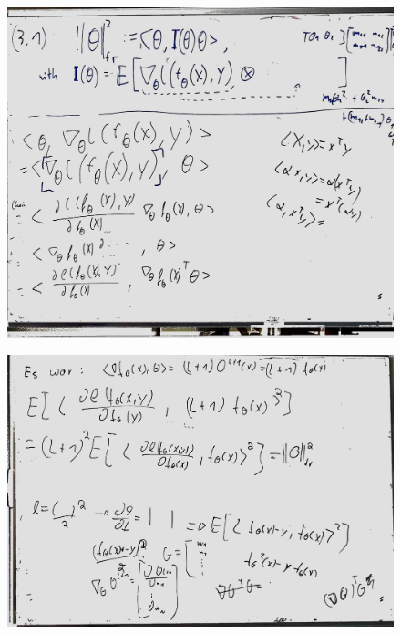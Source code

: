 \documentclass[a4paper]{article}
\begin{document}
\begin{figure}[htb]
	\centering
\includegraphics[width=\textwidth]{whiteboard_notes/3_1_proof_cont.jpg}
\end{figure}

\begin{figure}[htb]
	\centering
\includegraphics[width=\textwidth]{whiteboard_notes/07.jpg}
\end{figure}
\end{document}
